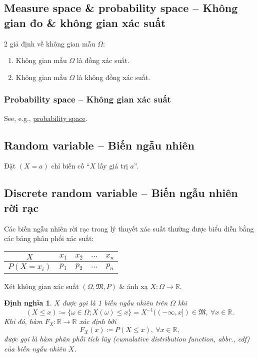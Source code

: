 \documentclass{article}
\newtheorem{dinhnghia}{Định nghĩa}
\begin{document}

\subsection{Measure space \& probability space -- Không gian đo \& không gian xác suất}
2 giả định về không gian mẫu $\Omega$:
\begin{enumerate}
	\item Không gian mẫu $\Omega$ là đồng xác suất.
	\item Không gian mẫu $\Omega$ là không đồng xác suất.
\end{enumerate}

\subsubsection{Probability space -- Không gian xác suất}
See, e.g., \href{https://en.wikipedia.org/wiki/Probability_space}{probability space}.


\subsection{Random variable -- Biến ngẫu nhiên}
Đặt $(X = a)$ chỉ biến cố ``$X$ lấy giá trị $a$''.


\subsection{Discrete random variable -- Biến ngẫu nhiên rời rạc}
Các biến ngẫu nhiên rời rạc trong lý thuyết xác suất thường được biểu diễn bằng các bảng phân phối xác suất:
\begin{table}[H]
	\centering
	\begin{tabular}{|c|c|c|c|c|}
		\hline
		$X$ & $x_1$ & $x_2$ & $\ldots$ & $x_n$ \\
		\hline
		$P(X = x_i)$ & $p_1$ & $p_2$ & $\ldots$ & $p_n$ \\
		\hline
	\end{tabular}
\end{table}
Xét không gian xác suất $(\Omega,\mathfrak{M},P)$ \& ánh xạ $X:\Omega\to\mathbb{R}$.

\begin{dinhnghia}
	$X$ được gọi là 1 {\rm biến ngẫu nhiên} trên $\Omega$ khi
	\begin{equation*}
		(X\le x)\coloneqq\{\omega\in\Omega;X(\omega)\le x\} = X^{-1}((-\infty,x])\in\mathfrak{M},\ \forall x\in\mathbb{R}.
	\end{equation*}
	Khi đó, hàm $F_X:\mathbb{R}\to\mathbb{R}$ xác định bởi
	\begin{equation}
		\label{cdf}
		\tag{cdf}
		F_X(x)\coloneqq P(X\le x),\ \forall x\in\mathbb{R},
	\end{equation}
	được gọi là {\rm hàm phân phối tích lũy (cumulative distribution function, abbr., cdf)} của biến ngẫu nhiên $X$.
\end{dinhnghia}
\end{document}
